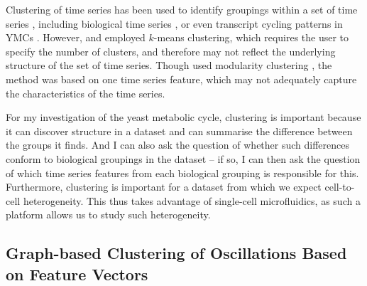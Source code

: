 Clustering of time series has been used to identify groupings within a set of time series \parencite{wangStructureBasedStatisticalFeatures2007}, including biological time series \parencite{shafieiDopamineSignalingModulates2019}, or even transcript cycling patterns in YMCs \parencite{tuLogicYeastMetabolic2005}.
However, \textcite{wangStructureBasedStatisticalFeatures2007} and \textcite{tuLogicYeastMetabolic2005} employed $k$-means clustering, which requires the user to specify the number of clusters, and therefore may not reflect the underlying structure of the set of time series.
Though \textcite{shafieiDopamineSignalingModulates2019} used modularity clustering \parencite{newmanModularityCommunityStructure2006}, the method was based on one time series feature, which may not adequately capture the characteristics of the time series.

For my investigation of the yeast metabolic cycle, clustering is important because it can discover structure in a dataset and can summarise the difference between the groups it finds.
And I can also ask the question of whether such differences conform to biological groupings in the dataset -- if so, I can then ask the question of which time series features from each biological grouping is responsible for this.
Furthermore, clustering is important for a dataset from which we expect cell-to-cell heterogeneity.
This thus takes advantage of single-cell microfluidics, as such a platform allows us to study such heterogeneity.


\subsection{Graph-based Clustering of Oscillations Based on Feature Vectors}
\label{subsec:analysis-clustering-graphclustering}

